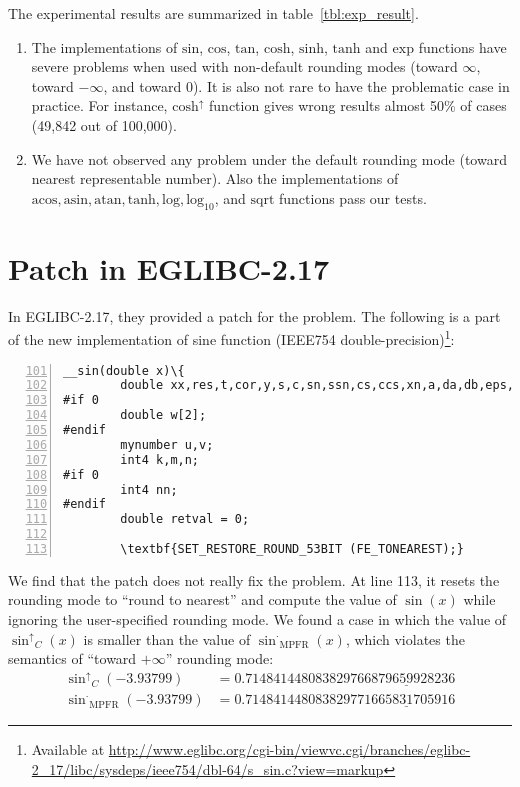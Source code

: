 \documentclass[12pt]{article}
\newcommand{\rup}[1]{\ensuremath{\mathrm{#1}^{\uparrow}}}
\newcommand{\rne}[1]{\ensuremath{\mathrm{#1}^{\cdot}}}
\begin{document}
The experimental results are summarized in table~\ref{tbl:exp_result}.
\begin{enumerate}
\item The implementations of $\mathrm{sin}$, $\mathrm{cos}$,
  $\mathrm{tan}$, $\mathrm{cosh}$, $\mathrm{sinh}$, $\mathrm{tanh}$
  and $\mathrm{exp}$ functions have severe problems when used with
  non-default rounding modes (toward $\infty$, toward $-\infty$, and
  toward $0$). It is also not rare to have the problematic case in
  practice. For instance, $\rup{cosh}$ function gives wrong results
  almost 50\% of cases (49,842 out of 100,000).
\item We have not observed any problem under the default rounding mode
  (toward nearest representable number). Also the implementations of
  $\mathrm{acos}, \mathrm{asin}, \mathrm{atan}, \mathrm{tanh},
  \mathrm{log}, \mathrm{log_{10}}$, and $\mathrm{sqrt}$ functions pass
  our tests.
\end{enumerate}

\section{Patch in EGLIBC-2.17}\label{sec:fix}

In EGLIBC-2.17, they provided a patch for the problem. The following
is a part of the new implementation of sine function (IEEE754
double-precision)\footnote{Available at
  \url{http://www.eglibc.org/cgi-bin/viewvc.cgi/branches/eglibc-2_17/libc/sysdeps/ieee754/dbl-64/s_sin.c?view=markup}}:

\begin{Verbatim}[numbers=left, frame=single, firstnumber=101,
  commandchars=\\\{\}, fontsize=\relsize{-1}, label={\texttt{eglibc-2.17/libc/sysdeps/ieee754/dbl-64/s\_sin.c}}, labelposition=topline  ]
__sin(double x)\{
        double xx,res,t,cor,y,s,c,sn,ssn,cs,ccs,xn,a,da,db,eps,xn1,xn2;
#if 0
        double w[2];
#endif
        mynumber u,v;
        int4 k,m,n;
#if 0
        int4 nn;
#endif
        double retval = 0;

        \textbf{SET_RESTORE_ROUND_53BIT (FE_TONEAREST);}
\end{Verbatim}

We find that the patch does not really fix the problem. At line 113,
it resets the rounding mode to ``round to nearest'' and compute the
value of $\sin(x)$ while ignoring the user-specified rounding mode. We
found a case in which the value of $\rup{\sin}_{C}(x)$ is smaller than
the value of $\rne{\sin}_{\mathrm{MPFR}}(x)$, which violates the
semantics of ``toward $+\infty$'' rounding mode:
\begin{align*}
            \rup{\sin}_{C}(-3.93799) & = 0.7148414480838297\underline{66879659928236}\\
   \rne{\sin}_{\mathrm{MPFR}}(-3.93799) & = 0.7148414480838297\underline{71665831705916}
\end{align*}
\end{document}
